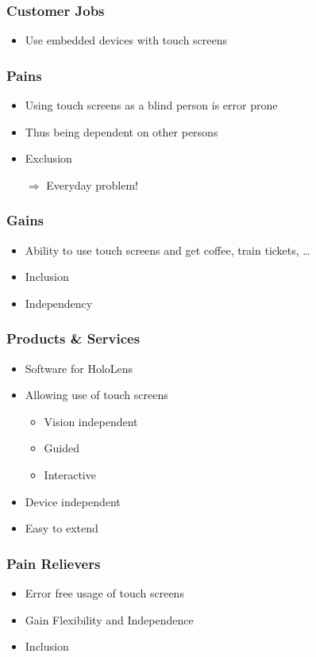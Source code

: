 \begin{frame}
	\frametitle{Customer Jobs}
	\begin{itemize}
		\item
			Use embedded devices with touch screens
	\end{itemize}
\end{frame}


\begin{frame}
	\frametitle{Pains}
	\begin{itemize}
		\item
			Using touch screens as a blind person is error prone
		\item
			Thus being dependent on other persons
		\item
			Exclusion
	\end{itemize}
	\vfill
	\begin{itemize}
		\item[$\Rightarrow$]
			Everyday problem!
	\end{itemize}
\end{frame}

\begin{frame}
	\frametitle{Gains}
	\begin{itemize}
		\item
			Ability to use touch screens and get coffee, train tickets, \dots
		\item
			Inclusion
		\item
			Independency
	\end{itemize}
\end{frame}

\begin{frame}
	\frametitle{Products \& Services}
	\begin{itemize}
		\item
			Software for HoloLens
		\item
			Allowing use of touch screens
			\begin{itemize}
				\item
					Vision independent
				\item
					Guided
				\item
					Interactive
			\end{itemize}
		\item
			Device independent
		\item
			Easy to extend
	\end{itemize}
\end{frame}


\begin{frame}
	\frametitle{Pain Relievers}
	\begin{itemize}
		\item
			Error free usage of touch screens
		\item
			Gain Flexibility and Independence
		\item
			Inclusion
	\end{itemize}
\end{frame}

